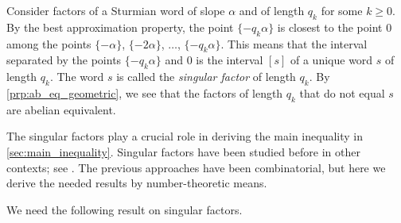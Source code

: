 \documentclass[a4paper,fleqn]{article}
\begin{document}
  \begin{remark}\label{rem:singular}
    Consider factors of a Sturmian word of slope $\alpha$ and of length $q_k$ for some $k \geq 0$. By the best
    approximation property, the point $\{-q_k\alpha\}$ is closest to the point $0$ among the points $\{-\alpha\}$,
    $\{-2\alpha\}$, $\ldots$, $\{-q_k \alpha\}$. This means that the interval separated by the points $\{-q_k\alpha\}$
    and $0$ is the interval $[s]$ of a unique word $s$ of length $q_k$. The word $s$ is called the \emph{singular
    factor} of length $q_k$. By \autoref{prp:ab_eq_geometric}, we see that the factors of length $q_k$ that do not
    equal $s$ are abelian equivalent.
    
    The singular factors play a crucial role in deriving the main inequality in \autoref{sec:main_inequality}. Singular
    factors have been studied before in other contexts; see
    \cite{1999:lyndon_words_and_singular_factors_of_sturmian,2003:some_properties_of_the_factors_of_sturmian_sequences}.
    The previous approaches have been combinatorial, but here we derive the needed results by number-theoretic means.
  \end{remark}

  We need the following result on singular factors.
\end{document}
